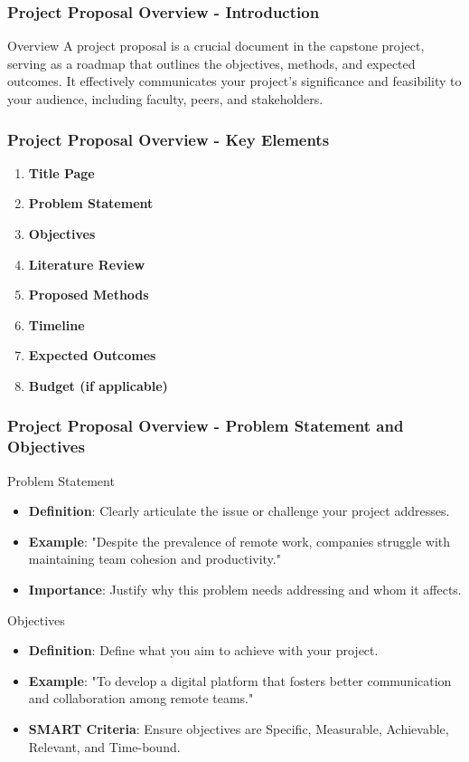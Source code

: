 \documentclass[aspectratio=169]{beamer}
\begin{document}
\begin{frame}[fragile]
    \frametitle{Project Proposal Overview - Introduction}
    \begin{block}{Overview}
        A project proposal is a crucial document in the capstone project, serving as a roadmap that outlines the objectives, methods, and expected outcomes. It effectively communicates your project's significance and feasibility to your audience, including faculty, peers, and stakeholders.
    \end{block}
\end{frame}

\begin{frame}[fragile]
    \frametitle{Project Proposal Overview - Key Elements}
    \begin{enumerate}
        \item \textbf{Title Page}
        \item \textbf{Problem Statement}
        \item \textbf{Objectives}
        \item \textbf{Literature Review}
        \item \textbf{Proposed Methods}
        \item \textbf{Timeline}
        \item \textbf{Expected Outcomes}
        \item \textbf{Budget (if applicable)}
    \end{enumerate}
\end{frame}

\begin{frame}[fragile]
    \frametitle{Project Proposal Overview - Problem Statement and Objectives}
    \begin{block}{Problem Statement}
        \begin{itemize}
            \item \textbf{Definition}: Clearly articulate the issue or challenge your project addresses.
            \item \textbf{Example}: "Despite the prevalence of remote work, companies struggle with maintaining team cohesion and productivity."
            \item \textbf{Importance}: Justify why this problem needs addressing and whom it affects.
        \end{itemize}
    \end{block}

    \begin{block}{Objectives}
        \begin{itemize}
            \item \textbf{Definition}: Define what you aim to achieve with your project.
            \item \textbf{Example}: "To develop a digital platform that fosters better communication and collaboration among remote teams."
            \item \textbf{SMART Criteria}: Ensure objectives are Specific, Measurable, Achievable, Relevant, and Time-bound.
        \end{itemize}
    \end{block}
\end{frame}
\end{document}
